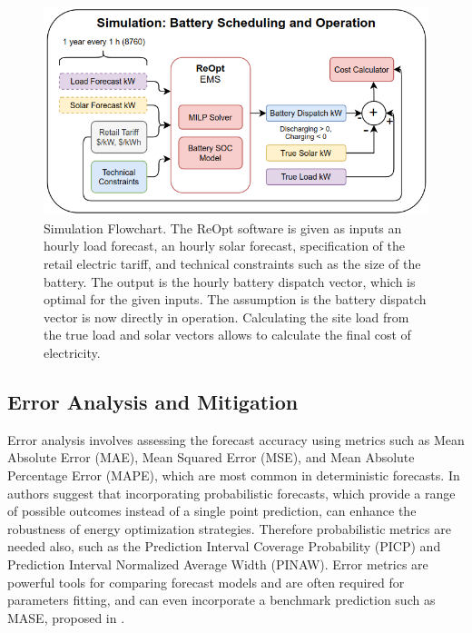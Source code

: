\documentclass[conference]{IEEEtran}
\begin{document}
\begin{figure}
    \centering
    \includegraphics[width=1\linewidth]{flowchart.png}
    \caption{Simulation Flowchart. The ReOpt software is given as inputs an hourly load forecast, an hourly solar forecast, specification of the retail electric tariff, and technical constraints such as the size of the battery. The output is the hourly battery dispatch vector, which is optimal for the given inputs. The assumption is the battery dispatch vector is now directly in operation. Calculating the site load from the true load and solar vectors allows to calculate the final cost of electricity.}
    \label{fig:flowchart}
\end{figure}


\subsection{Error Analysis and Mitigation}

Error analysis involves assessing the forecast accuracy using metrics such as Mean Absolute Error (MAE), Mean Squared Error (MSE), and Mean Absolute Percentage Error (MAPE), which are most common in deterministic forecasts. In \cite{b5} authors suggest that incorporating probabilistic forecasts, which provide a range of possible outcomes instead of a single point prediction, can enhance the robustness of energy optimization strategies. Therefore probabilistic metrics are needed also, such as the Prediction Interval Coverage Probability (PICP) and Prediction Interval Normalized Average Width (PINAW). Error metrics are powerful tools for comparing forecast models and are often required for parameters fitting, and can even incorporate a benchmark prediction such as MASE, proposed in \cite{b9}.
\end{document}
